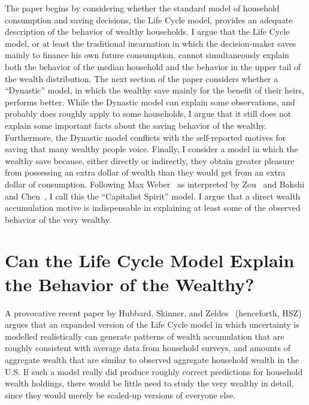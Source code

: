 \documentclass[titlepage,12pt]{article}
\begin{document}
The paper begins by considering whether the standard model of 
household consumption and saving decisions, the Life Cycle model, 
provides an adequate description of the behavior of wealthy 
households.  I argue that the Life Cycle model, or at least the 
traditional incarnation in which the decision-maker saves mainly to 
finance his own future consumption, cannot simultaneously explain both 
the behavior of the median household and the behavior in the 
upper tail of the wealth distribution.  The next section of the paper 
considers whether a ``Dynastic'' model, in which the wealthy save 
mainly for the benefit of their heirs, performs better.  While the 
Dynastic model can explain some observations, and probably does 
roughly apply to some households, I argue that it still does not 
explain some important facts about the saving behavior of the wealthy.  
Furthermore, the Dynastic model conflicts with the self-reported 
motives for saving that many wealthy people voice.  Finally, I 
consider a model in which the wealthy save because, either directly or 
indirectly, they obtain greater pleasure from possessing an extra 
dollar of wealth than they would get from an extra dollar of 
consumption.  Following Max Weber~\citeyear{weber:capitalism} as 
interpreted by Zou~\citeyear{zou:spirit} and Bakshi and 
Chen~\citeyear{bakshi&chen:spirit}, I call this the ``Capitalist Spirit'' 
model.  I argue that a direct wealth accumulation motive is 
indispensable in explaining at least some of the observed behavior of 
the very wealthy.

\hypertarget{can-the-life-cycle-model-explain-the-behavior-of-the-wealthy}{}
\section{Can the Life Cycle Model Explain the Behavior of the Wealthy?}
\label{sec:LCModel}
A provocative recent paper by Hubbard, Skinner, and 
Zeldes~\citeyear{hsz:importance} (henceforth, HSZ) argues that an expanded 
version of the Life Cycle model in which uncertainty is modelled 
realistically can generate patterns of wealth accumulation that are 
roughly consistent with average data from household surveys, and 
amounts of aggregate wealth that are similar to observed aggregate 
household wealth in the U.S. If such a model really did produce 
roughly correct predictions for household wealth holdings, there would 
be little need to study the very wealthy in detail, since they would 
merely be scaled-up versions of everyone else.
\end{document}
